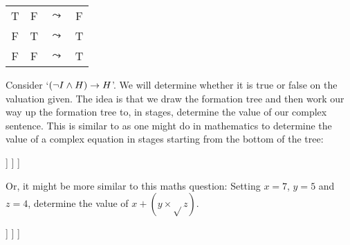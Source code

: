 {\begin{enumerate}
\begin{center}
\begin{tabular}{cccc}
				T & F &$\leadsto$& F\\
				F & T &$\leadsto$& T\\
				F & F &$\leadsto$& T
			\end{tabular}
		\end{center}
	\end{enumerate}
}

Consider 
`$(\neg I\mathbin{\wedge} H)\rightarrow H$'. We will determine whether it is true or false on the valuation given. 
The idea is that we draw the formation tree and then work our way up the formation tree to, in stages, determine the value of our complex sentence.
This is similar to as one might do in mathematics to determine the value of a complex equation in stages starting from the bottom of the tree:
\begin{center}
	\begin{forest}
		[{$7\mainconnective{+}(5\times\sqrt{}4)$}, label=right:{\scriptsize $=17$}
		[{$7$}]
		[{$(5\mainconnective{\times} \sqrt{}4)$}, label=right:{\scriptsize $=10$}
		[{$5$}]
		[{$\mainconnective{\sqrt{}}{4}$}, label=right:{\scriptsize $=2$}
		[{$4$}]
		]
		]
		]
	\end{forest}
\end{center}

Or, it might be more similar to this maths question: Setting $x=7$, $y=5$ and $z=4$,  determine the value of $x+(y\times\sqrt{}z)$. 
\begin{center}
	\begin{forest}
		[{$x\mainconnective{+}(y\times\sqrt{}z)$}, label=right:{\scriptsize $=17$}
		[$\atomicstage{x}$, label=left:{\scriptsize $7=$}]
		[{$y\mainconnective{\times}\sqrt{}z$}, label=right:{\scriptsize $=10$}
		[$\atomicstage{y}$, label=left:{\scriptsize $5=$}]
		[{$\mainconnective{\sqrt{}}z$}, label=right:{\scriptsize $=2$}
		[$\atomicstage{z}$, label=right:{\scriptsize $=4$}]
		]
		]
		]
	\end{forest}
\end{center}

